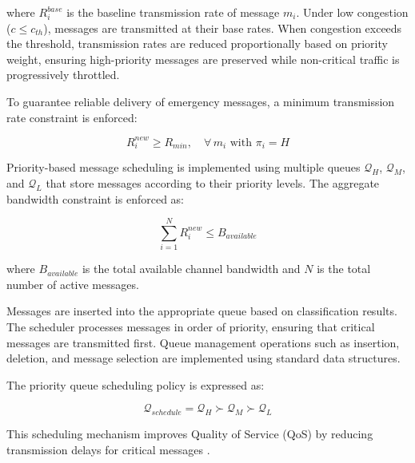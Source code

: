 \noindent where $R_i^{base}$ is the baseline transmission rate 
of message $m_i$. Under low congestion ($c \leq c_{th}$), messages 
are transmitted at their base rates. When congestion exceeds the 
threshold, transmission rates are reduced proportionally based on 
priority weight, ensuring high-priority messages are preserved 
while non-critical traffic is progressively throttled.

To guarantee reliable delivery of emergency messages, a minimum 
transmission rate constraint is enforced:

\begin{equation}
R_i^{new} \geq R_{min}, \quad \forall \, m_i \text{ with } \pi_i = H
\label{eq:min_rate}
\end{equation}

Priority-based message scheduling is implemented using multiple 
queues $\mathcal{Q}_H$, $\mathcal{Q}_M$, and $\mathcal{Q}_L$ 
that store messages according to their priority levels. The 
aggregate bandwidth constraint is enforced as:

\begin{equation}
\sum_{i=1}^{N} R_i^{new} \leq B_{available}
\label{eq:bandwidth_constraint}
\end{equation}

\noindent where $B_{available}$ is the total available channel 
bandwidth and $N$ is the total number of active messages.

Messages are inserted into the appropriate queue based on 
classification results. The scheduler processes messages in 
order of priority, ensuring that critical messages are 
transmitted first. Queue management operations such as 
insertion, deletion, and message selection are implemented 
using standard data structures.

The priority queue scheduling policy is expressed as:

\begin{equation}
\mathcal{Q}_{schedule} = \mathcal{Q}_H \succ \mathcal{Q}_M \succ \mathcal{Q}_L
\label{eq:priority_queue}
\end{equation}

This scheduling mechanism improves Quality of Service (QoS) by 
reducing transmission delays for critical messages \cite{rahman2022uavqos}.

